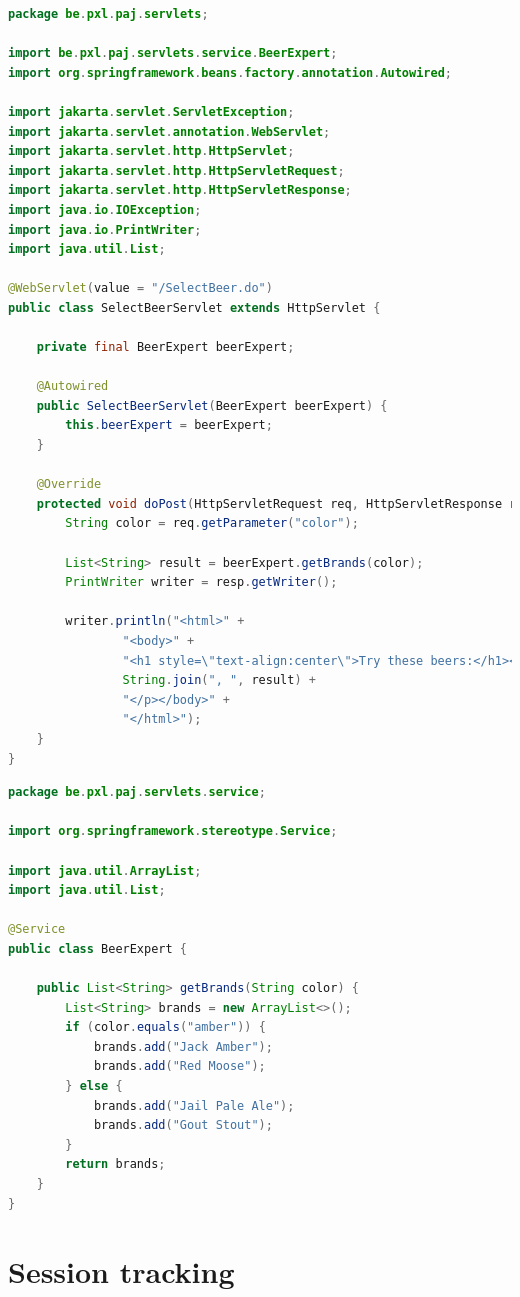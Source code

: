 \begin{lstlisting}[frame=single, language=java]
package be.pxl.paj.servlets;

import be.pxl.paj.servlets.service.BeerExpert;
import org.springframework.beans.factory.annotation.Autowired;

import jakarta.servlet.ServletException;
import jakarta.servlet.annotation.WebServlet;
import jakarta.servlet.http.HttpServlet;
import jakarta.servlet.http.HttpServletRequest;
import jakarta.servlet.http.HttpServletResponse;
import java.io.IOException;
import java.io.PrintWriter;
import java.util.List;

@WebServlet(value = "/SelectBeer.do")
public class SelectBeerServlet extends HttpServlet {

	private final BeerExpert beerExpert;

	@Autowired
	public SelectBeerServlet(BeerExpert beerExpert) {
		this.beerExpert = beerExpert;
	}

	@Override
	protected void doPost(HttpServletRequest req, HttpServletResponse resp) throws ServletException, IOException {
		String color = req.getParameter("color");

		List<String> result = beerExpert.getBrands(color);
		PrintWriter writer = resp.getWriter();

		writer.println("<html>" +
				"<body>" +
				"<h1 style=\"text-align:center\">Try these beers:</h1><p>" +
				String.join(", ", result) +
				"</p></body>" +
				"</html>");
	}
}
\end{lstlisting}

\begin{lstlisting}[frame=single, language=java]
package be.pxl.paj.servlets.service;

import org.springframework.stereotype.Service;

import java.util.ArrayList;
import java.util.List;

@Service
public class BeerExpert {

	public List<String> getBrands(String color) {
		List<String> brands = new ArrayList<>();
		if (color.equals("amber")) {
			brands.add("Jack Amber");
			brands.add("Red Moose");
		} else {
			brands.add("Jail Pale Ale");
			brands.add("Gout Stout");
		}
		return brands;
	}
}
\end{lstlisting}


\section{Session tracking}

